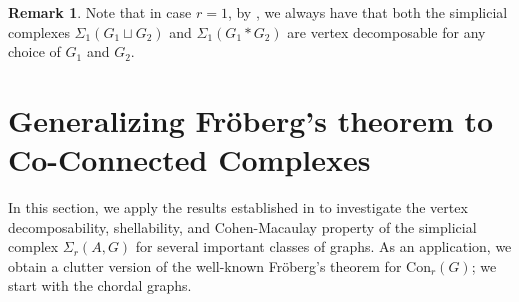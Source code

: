 \documentclass[12pt,reqno]{amsart}
\theoremstyle{definition}
\newtheorem{remark}[proposition]{Remark}
\newcommand{\Con}{{\mathrm{Con}}}
\def\SrAG{\Sigma_r(A,G)}
\begin{document}
	
	\begin{remark}
		Note that in case $r=1$, by , we always have that both the simplicial complexes $\Sigma_1(G_1\sqcup G_2)$ and $\Sigma_1(G_1*G_2)$ are vertex decomposable for any choice of $G_1$ and $G_2$.
	\end{remark}
	
	
	
	
	
\section{Generalizing Fr\"oberg's theorem to Co-Connected Complexes}\label{Section 4 Froberg}
	
In this section, we apply the results established in  to investigate the vertex decomposability, shellability, and Cohen-Macaulay property of the simplicial complex $\SrAG$ for several important classes of graphs.
As an application, we obtain a clutter version of the well-known Fr\"oberg's theorem for $\Con_r(G)$; we start with the chordal graphs. 
	
\end{document}
